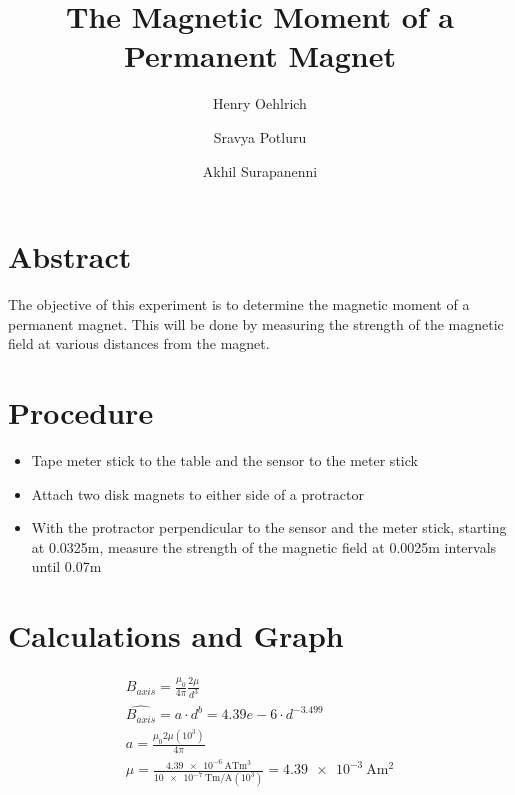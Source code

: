 \documentclass{article}
\title{The Magnetic Moment of a Permanent Magnet}
\author{Henry Oehlrich\and Sravya Potluru\and Akhil Surapanenni}
\begin{document}
\maketitle

\section{Abstract}

The objective of this experiment is to determine the magnetic moment of a
permanent magnet. This will be done by measuring the strength of the magnetic
field at various distances from the magnet.

\section{Procedure}

\begin{itemize}
    \item Tape meter stick to the table and the sensor to the meter stick
    \item Attach two disk magnets to either side of a protractor
    \item With the protractor perpendicular to the sensor and the meter stick,
        starting at 0.0325\si{\meter}, measure the strength of the magnetic
        field at 0.0025\si{\meter} intervals until 0.07\si{\meter}
\end{itemize}

\section{Calculations and Graph}

\setlength{\jot}{15pt}
\begin{gather}
    B_{axis} = \frac{\mu_0}{4\pi} \frac{2\mu}{d^3} \\
    \hat{B_{axis}} = a \cdot d^{b} = 4.39e-6 \cdot d^{-3.499} \\
    a = \frac{\mu_0 2 \mu (10^3)}{4\pi} \\
    \mu =
    \frac{\SI{4.39e-6}{\ampere\tesla\meter\cubed}}{\SI{10e-7}{\tesla\meter\per\ampere}(10^3)} = \SI{4.39e-3}{\ampere\meter\squared}
\end{gather}

\begin{center}
\end{center}
\end{document}

